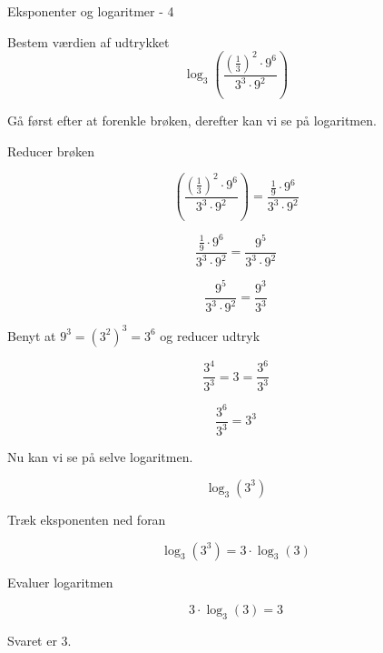 \documentclass{article}
\begin{document}
\newpage
\begin{exercise}{Eksponenter og logaritmer - 4}

Bestem værdien af udtrykket
\[
\log_3\left(\frac{\left(\frac{1}{3}\right)^2 \cdot 9^6}{3^3 \cdot 9^2} \right)
\]


\hint
Gå først efter at forenkle brøken, derefter kan vi se på logaritmen.

\hint
Reducer brøken

\hint
\[
\left(\frac{\left(\frac{1}{3}\right)^2 \cdot 9^6}{3^3 \cdot 9^2} \right) = \frac{\frac{1}{9} \cdot 9^6}{3^3 \cdot 9^2}
\]

\hint
\[
\frac{\frac{1}{9} \cdot 9^6}{3^3 \cdot 9^2} = \frac{9^5}{3^3 \cdot 9^2}
\]

\hint
\[
 \frac{9^5}{3^3 \cdot 9^2} = \frac{9^3}{3^3}
\]

\hint
Benyt at $9^3=(3^2)^3 = 3^6$ og reducer udtryk

\hint
\[
\frac{3^4}{3^3} = 3 = \frac{3^6}{3^3}
\]

\hint
\[
\frac{3^6}{3^3} = 3^3
\]


\hint
Nu kan vi se på selve logaritmen.

\hint
\[
\log_3\left(3^3\right)
\]


\hint
Træk eksponenten ned foran

\hint
\[
\log_3\left(3^{3}\right) = 3 \cdot \log_3(3)
\]

\hint
Evaluer logaritmen

\hint
\[
3 \cdot \log_3(3) = 3
\]

\hint
Svaret er $3$.

\end{exercise}
\end{document}

